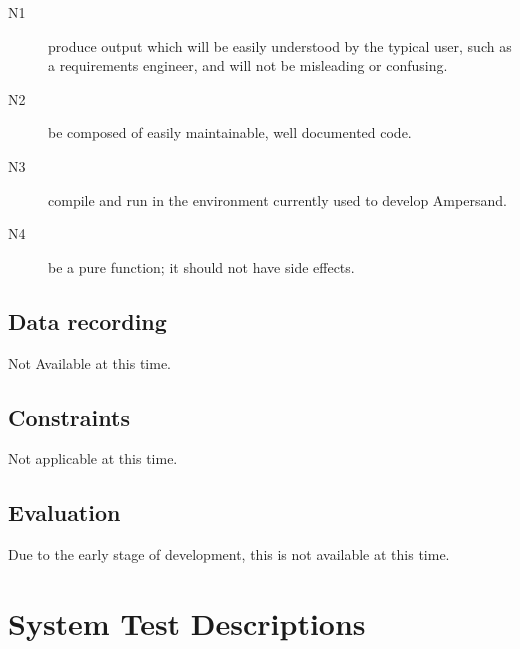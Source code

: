 \documentclass[12pt]{report}
\begin{document}
\begin{description}
\item[N1] produce output which will be easily understood by the typical user,
  such as a requirements engineer, and will not be misleading or confusing.  
\item[N2] be composed of easily maintainable, well documented code.
\item[N3] compile and run in the environment currently used to develop
  Ampersand.
\item[N4] be a pure function; it should not have side effects.  
\end{description}

\section{Data recording}\label{sec:DataRec}
Not Available at this time.
\section{Constraints}\label{sec:Constraints}
Not applicable at this time.
\section{Evaluation}\label{sec:Evaluation}
Due to the early stage of development, this is not available at this time.

\chapter{System Test Descriptions}\label{ch:SystemTests}
\newcommand{\us}{\textunderscore}
\newcommand{\tabb}{\hspace{35pt}}
\setcounter{sysTestNum}{1}

\newcommand{\ECAIns}[2]{\mathbf{Ins}(#1,#2)}
\newcommand{\ECADel}[2]{\mathbf{Del}(#1,#2)}
\newcommand{\ECAInsDel}[2]{\mathbf{\{Ins/Del\}}(#1,#2)}
\newcommand{\ECADelIns}[2]{\mathbf{\{Del/Ins\}}(#1,#2)}
\newcommand{\ECAOn}{\mathbf{On~}}
\newcommand{\ECADo}{\ECASpacer\mathbf{Do~}}
\newcommand{\ECANop}{\mathbf{Nop~}}
\newcommand{\ECASpacer}{\,\,\,\,}
\newcommand{\IRel}[1]{\mathbb{I}_{#1}}
\newcommand{\VRel}[2]{\mathbb{V}_{#1\times#2}}

\newcommand{\systemTest}[5]{
\section*{T\arabic{sysTestNum}~~~ #2}\label{sec:#1}
\addcontentsline{toc}{section}{T\arabic{sysTestNum}~~~ #2}
\stepcounter{sysTestNum}
\hspace{-6pt}\begin{tabular}{p{3cm}l}
\textbf{Test type}     &   #3 \\ 
\textbf{Schedule}      &   #4 \\
\textbf{Requirements}  &   #5 \\
\end{tabular}
}
\end{document}
